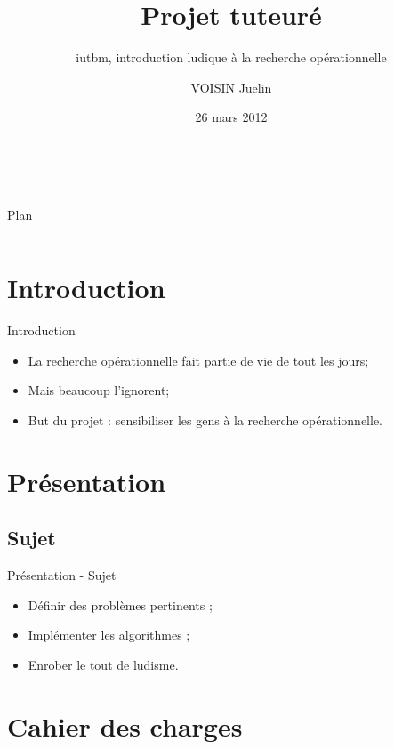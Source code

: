 \documentclass{beamer}
\title[Projet tuteuré]{Projet tuteuré}
\subtitle[Projet Tuteuré]{iutbm, introduction ludique à la recherche opérationnelle}
\author[]{VOISIN Juelin}
\institute{IUT informatique Belfort}
\date{26 mars 2012}
\begin{document}
\begin{frame}{~}
	\titlepage
\end{frame}

%
%

\begin{frame}{Plan}
	\begin{columns}[t]
		\begin{column}{5cm}
			\tableofcontents[sections={1-5}, hideothersubsections]
		\end{column}
		\begin{column}{5cm}
			\tableofcontents[sections={6-9}, hideothersubsections]
		\end{column}
	\end{columns}
\end{frame}

\section{Introduction}
	\begin{frame}{Introduction}
		\begin{itemize}
			\setlength{\itemsep}{0.5cm}
			\item La recherche opérationnelle fait partie de vie de tout les jours;
			\item Mais beaucoup l'ignorent;
			\item But du projet : sensibiliser les gens à la recherche
			    opérationnelle.
		\end{itemize}
	\end{frame}

\section{Présentation}
	\subsection{Sujet}
		\begin{frame}{Présentation - Sujet}
			\begin{itemize}
				\setlength{\itemsep}{1cm}
				\item Définir des problèmes pertinents ;
				\item Implémenter les algorithmes ;
				\item Enrober le tout de ludisme.
			\end{itemize}
		\end{frame}
\section{Cahier des charges}
\end{document}
